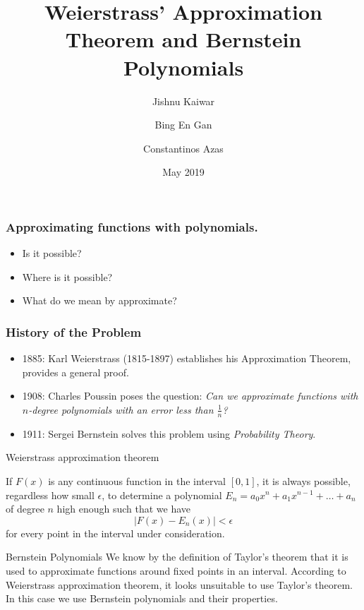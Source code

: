 \documentclass[mathserif,serif]{beamer}
\title{Weierstrass' Approximation Theorem and Bernstein Polynomials}
\author{Jishnu Kaiwar
  \and
  Bing En Gan
  \and
  Constantinos Azas}
\date{May 2019}
\begin{document}
\frame{\titlepage}

\begin{frame}
  \frametitle{Approximating functions with polynomials.}
  \begin{itemize}
  \item<+-> Is it possible?
  \item<+-> Where is it possible?
  \item<+-> What do we mean by approximate?

  \end{itemize}
\end{frame}

\begin{frame}
  \frametitle{History of the Problem}
  \begin{itemize}
  \item 1885: Karl Weierstrass (1815-1897) establishes his Approximation Theorem, provides a general proof.
  \item 1908: Charles Poussin poses the question: \emph{Can we approximate functions with $n$-degree polynomials with an error less than $\frac{1}{n}$?}
  \item 1911: Sergei Bernstein solves this problem using \emph{Probability Theory}.
  \end{itemize}
\end{frame}

\begin{frame}{Weierstrass approximation theorem}
\begin{theorem}
If $F(x)$ is any continuous function in the interval $[0,1]$, it is always possible, regardless how small $\epsilon$, to determine a polynomial $E_n=a_0x^n+a_1x^{n-1}+\dots+a_n$ of degree $n$ high enough such that we have
\begin{equation*}
    |F(x)-E_n(x)|<\epsilon
\end{equation*}
for every point in the interval under consideration.
\end{theorem}
\end{frame}

\begin{frame}{Bernstein Polynomials}
We know by the definition of Taylor's theorem that it is used to approximate functions around fixed points in an interval. According to Weierstrass approximation theorem, it looks unsuitable to use Taylor's theorem. In this case we use Bernstein polynomials and their properties.    
\end{frame}
\end{document}
